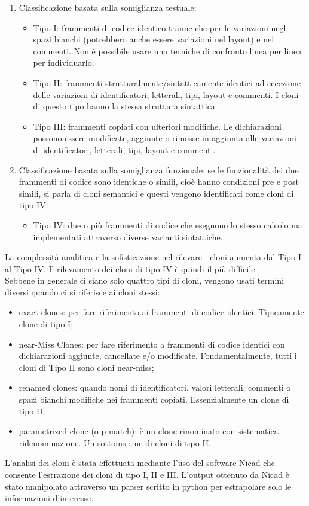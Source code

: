 \begin{enumerate}
\item Classificazione basata sulla somiglianza testuale:
\begin{itemize}
\item	Tipo I: frammenti di codice identico tranne che per le variazioni negli spazi bianchi (potrebbero anche essere variazioni nel layout) e nei commenti. Non è possibile usare una tecniche di confronto linea per linea per individuarlo.
\item	Tipo II: frammenti strutturalmente/sintatticamente identici ad eccezione delle variazioni di identificatori, letterali, tipi, layout e commenti. I cloni di questo tipo hanno la stessa struttura sintattica.
\item	Tipo III: frammenti copiati con ulteriori modifiche. Le dichiarazioni possono essere modificate, aggiunte o rimosse in aggiunta alle variazioni di identificatori, letterali, tipi, layout e commenti.
\end{itemize}
\item Classificazione basata sulla somiglianza funzionale: se le funzionalità dei due frammenti di codice sono identiche o simili, cioè hanno condizioni pre e post simili, si parla di cloni semantici e questi vengono identificati come cloni di tipo IV.
\begin{itemize}
\item	Tipo IV: due o più frammenti di codice che eseguono lo stesso calcolo ma implementati attraverso diverse varianti sintattiche. 
\end{itemize}
\end{enumerate}
La complessità analitica e la sofisticazione nel rilevare i cloni aumenta dal Tipo I al Tipo IV. Il rilevamento dei cloni di tipo IV è quindi il più difficile.\\
Sebbene in generale ci siano solo quattro tipi di cloni, vengono usati termini diversi quando ci si riferisce ai cloni stessi:
\begin{itemize}
\item	exact clones: per fare riferimento ai frammenti di codice identici. Tipicamente clone di tipo I;
\item	near-Miss Clones: per fare riferimento a frammenti di codice identici con dichiarazioni aggiunte, cancellate e/o modificate. Fondamentalmente, tutti i cloni di Tipo II sono cloni near-miss;
\item	renamed clones: quando nomi di identificatori, valori letterali, commenti o spazi bianchi modifiche nei frammenti copiati. Essenzialmente un clone di tipo II;
\item	parametrized clone (o p-match): è un clone rinominato con sistematica ridenominazione. Un sottoinsieme di cloni di tipo II.
\end{itemize}
L'analisi dei cloni è stata effettuata mediante l'uso del software Nicad che consente l'estrazione dei cloni di tipo I, II e III. L'output ottenuto da Nicad è stato manipolato attraverso un parser scritto in python per estrapolare solo le informazioni d'interesse.


